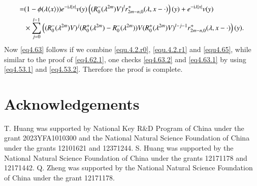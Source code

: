 \documentclass[11pt,reqno]{amsart}
\def\i{{\rm i}}
\numberwithin{equation}{section}
\theoremstyle{definition}
\begin{document}
\begin{appendix}
\begin{align*}
			=&(1-\phi(\lambda\langle x\rangle))e^{-\i\lambda |x|}v(y)\left((R_{0}^{-}(\lambda^{2m})V)^{l}
			r^{+}_{2m-n, 0}(\lambda, x-\cdot)\right)(y)+e^{-\i\lambda |x|}v(y)\\
			&\times\sum_{j=0}^{l-1}\left((R_{0}^{-}(\lambda^{2m})V)^{j}(R_{0}^{+}(\lambda^{2m})-R_{0}^{-}(\lambda^{2m}))V
			(R_{0}^{+}(\lambda^{2m})V)^{l-j-1}r^{+}_{2m-n, 0}(\lambda, x-\cdot)\right)(y).
		\end{align*}
		Now \eqref{eq4.63} follows if we combine \eqref{equ.4.2.r0},  \eqref{equ.4.2.r1} and \eqref{equ4.65}, while similar to the proof of \eqref{eq4.62.1}, one checks \eqref{eq4.63.2} and \eqref{eq4.63.1} by using \eqref{eq4.53.1} and \eqref{eq4.53.2}. Therefore the proof is complete.

\end{appendix}



\section*{Acknowledgements}
T. Huang was supported by National Key R\&D Program of China under the grant 2023YFA1010300 and the National Natural Science Foundation of China under the grants 12101621 and 12371244.
S. Huang was supported by the National Natural Science Foundation of China under the grants 12171178 and 12171442.
Q. Zheng was supported by the National Natural Science Foundation of China under the grant 12171178.


%
%
\end{document}
